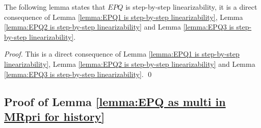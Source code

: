 The following lemma states that $\textit{EPQ}$ is step-by-step linearizability, it is a direct consequence of Lemma \ref{lemma:EPQ1 is step-by-step linearizability}, Lemma \ref{lemma:EPQ2 is step-by-step linearizability} and Lemma \ref{lemma:EPQ3 is step-by-step linearizability}.


\EPQueueisStepByStepLinearizability*

\begin {proof}
This is a direct consequence of Lemma \ref{lemma:EPQ1 is step-by-step linearizability}, Lemma \ref{lemma:EPQ2 is step-by-step linearizability} and Lemma \ref{lemma:EPQ3 is step-by-step linearizability}. \qed
\end {proof}


\subsection{Proof of Lemma \ref{lemma:EPQ as multi in MRpri for history}}

\EPQasMultiInMRpriforHistory*

